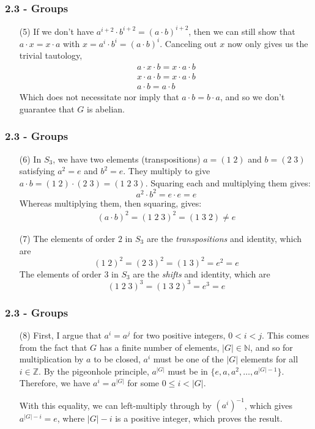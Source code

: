 \documentclass{beamer}
\begin{document}
\begin{frame}
\frametitle{2.3 - Groups}
\small
\begin{enumerate}
	\item[(5)] If we don't have $a^{i+2}\cdot b^{i+2} = (a\cdot b)^{i+2}$, then we can still show that $a\cdot x = x\cdot a$ with $x=a^i\cdot b^i = (a\cdot b)^i$. Canceling out $x$ now only gives us the trivial tautology,
	\begin{gather*}
	a\cdot x\cdot b = x\cdot a\cdot b \\
	x\cdot a\cdot b = x\cdot a\cdot b \\
	a\cdot b = a\cdot b
	\end{gather*}
	Which does not necessitate nor imply that $a\cdot b = b\cdot a$, and so we don't guarantee that $G$ is abelian.
\end{enumerate}
\end{frame}
\begin{frame}
\frametitle{2.3 - Groups}
\small
\begin{enumerate}
	\item[(6)] In $S_3$, we have two elements (transpositions) $a =(1\;2)$ and $b = (2\;3)$ satisfying $a^2 = e$ and $b^2 = e$. They multiply to give $a\cdot b = (1\;2)\cdot (2\;3) = (1\;2\;3)$. Squaring each and multiplying them gives:
	\begin{equation*}
	a^2\cdot b^2 = e\cdot e = e
	\end{equation*}
	Whereas multiplying them, then squaring, gives:
	\begin{gather*}
	(a\cdot b)^2 = (1\;2\;3)^2 = (1\;3\;2) \neq e
	\end{gather*}
	\item[(7)] The elements of order $2$ in $S_3$ are the \textit{transpositions} and identity, which are
	\begin{equation*}
	(1\;2)^2 = (2\;3)^2 = (1\;3)^2 = e^2 = e
	\end{equation*}
	The elements of order $3$ in $S_3$ are the \textit{shifts} and identity, which are
	\begin{equation*}
	(1\;2\;3)^3 = (1\;3\;2)^3 = e^3 = e
	\end{equation*}
\end{enumerate}
\end{frame}
\begin{frame}
\frametitle{2.3 - Groups}
\small
\begin{enumerate}
	\item[(8)] \quad First, I argue that $a^i= a^j$ for two positive integers, $0<i<j$. This comes from the fact that $G$ has a finite number of elements, $|G|\in\mathbb N$, and so for multiplication by $a$ to be closed, $a^i$ must be one of the $|G|$ elements for all $i\in\mathbb Z$. By the pigeonhole principle, $a^{|G|}$ must be in $\{e, a, a^2, \ldots, a^{|G|-1}\}$. Therefore, we have $a^i = a^{|G|}$ for some $0\leq i <|G|$.
	
	\quad With this equality, we can left-multiply through by $(a^i)^{-1}$, which gives $a^{|G| - i} = e$, where $|G| - i$ is a positive integer, which proves the result.
\end{enumerate}
\end{frame}
\end{document}
